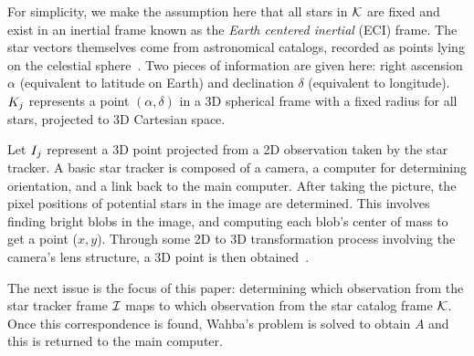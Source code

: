For simplicity, we make the assumption here that all stars in $\mathcal{K}$ are fixed and exist in an inertial frame
known as the \textit{Earth centered inertial} (ECI) frame.
The star vectors themselves come from astronomical catalogs, recorded as points lying on the celestial
sphere~\cite{tappe:starTrackerDevelopment}.
Two pieces of information are given here: right ascension $\alpha$ (equivalent to latitude on Earth) and
declination $\delta$ (equivalent to longitude).
$K_j$ represents a point $\left( \alpha, \delta \right)$ in a 3D spherical frame with a fixed radius for all stars,
projected to 3D Cartesian space.

Let $I_j$ represent a 3D point projected from a 2D observation taken by the star tracker.
A basic star tracker is composed of a camera, a computer for determining orientation, and a link back to the main
computer.
After taking the picture, the pixel positions of potential stars in the image are determined.
This involves finding bright blobs in the image, and computing each blob's center of mass to get a point ($x, y$).
Through some 2D to 3D transformation process involving the camera's lens structure, a 3D point is then
obtained~\cite{tappe:starTrackerDevelopment}.

The next issue is the focus of this paper: determining which observation from the star tracker frame $\mathcal{I}$
maps to which observation from the star catalog frame $\mathcal{K}$.
Once this correspondence is found, Wahba's problem is solved to obtain $A$ and this is returned to the main computer.
